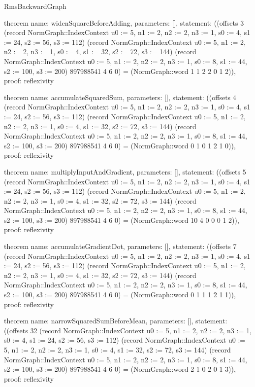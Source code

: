 \begin{lexlean}{RmsBackwardGraph}
\begin{semanticmodule}
theorem{
  name: widenSquareBeforeAdding,
  parameters: [],
  statement: ((offsets 3 (record NormGraph::IndexContext {u0 := 5, n1 := 2, n2 := 2, n3 := 1, s0 := 4, s1 := 24, s2 := 56, s3 := 112}) (record NormGraph::IndexContext {u0 := 5, n1 := 2, n2 := 2, n3 := 1, s0 := 4, s1 := 32, s2 := 72, s3 := 144}) (record NormGraph::IndexContext {u0 := 5, n1 := 2, n2 := 2, n3 := 1, s0 := 8, s1 := 44, s2 := 100, s3 := 200}) 897988541 4 6 0) = (NormGraph::word 1 1 2 2 0 1 2)),
  proof: reflexivity{}
}

theorem{
  name: accumulateSquaredSum,
  parameters: [],
  statement: ((offsets 4 (record NormGraph::IndexContext {u0 := 5, n1 := 2, n2 := 2, n3 := 1, s0 := 4, s1 := 24, s2 := 56, s3 := 112}) (record NormGraph::IndexContext {u0 := 5, n1 := 2, n2 := 2, n3 := 1, s0 := 4, s1 := 32, s2 := 72, s3 := 144}) (record NormGraph::IndexContext {u0 := 5, n1 := 2, n2 := 2, n3 := 1, s0 := 8, s1 := 44, s2 := 100, s3 := 200}) 897988541 4 6 0) = (NormGraph::word 0 1 0 1 2 1 0)),
  proof: reflexivity{}
}

theorem{
  name: multiplyInputAndGradient,
  parameters: [],
  statement: ((offsets 5 (record NormGraph::IndexContext {u0 := 5, n1 := 2, n2 := 2, n3 := 1, s0 := 4, s1 := 24, s2 := 56, s3 := 112}) (record NormGraph::IndexContext {u0 := 5, n1 := 2, n2 := 2, n3 := 1, s0 := 4, s1 := 32, s2 := 72, s3 := 144}) (record NormGraph::IndexContext {u0 := 5, n1 := 2, n2 := 2, n3 := 1, s0 := 8, s1 := 44, s2 := 100, s3 := 200}) 897988541 4 6 0) = (NormGraph::word 10 4 0 0 0 1 2)),
  proof: reflexivity{}
}

theorem{
  name: accumulateGradientDot,
  parameters: [],
  statement: ((offsets 7 (record NormGraph::IndexContext {u0 := 5, n1 := 2, n2 := 2, n3 := 1, s0 := 4, s1 := 24, s2 := 56, s3 := 112}) (record NormGraph::IndexContext {u0 := 5, n1 := 2, n2 := 2, n3 := 1, s0 := 4, s1 := 32, s2 := 72, s3 := 144}) (record NormGraph::IndexContext {u0 := 5, n1 := 2, n2 := 2, n3 := 1, s0 := 8, s1 := 44, s2 := 100, s3 := 200}) 897988541 4 6 0) = (NormGraph::word 0 1 1 1 2 1 1)),
  proof: reflexivity{}
}

theorem{
  name: narrowSquaredSumBeforeMean,
  parameters: [],
  statement: ((offsets 32 (record NormGraph::IndexContext {u0 := 5, n1 := 2, n2 := 2, n3 := 1, s0 := 4, s1 := 24, s2 := 56, s3 := 112}) (record NormGraph::IndexContext {u0 := 5, n1 := 2, n2 := 2, n3 := 1, s0 := 4, s1 := 32, s2 := 72, s3 := 144}) (record NormGraph::IndexContext {u0 := 5, n1 := 2, n2 := 2, n3 := 1, s0 := 8, s1 := 44, s2 := 100, s3 := 200}) 897988541 4 6 0) = (NormGraph::word 2 1 0 2 0 1 3)),
  proof: reflexivity{}
}


\end{semanticmodule}
\end{lexlean}
